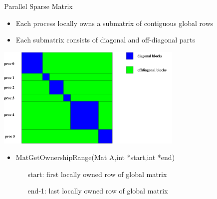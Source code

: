 
\begin{frame}{Parallel Sparse Matrix}
\begin{itemize}
  \item Each process locally owns a submatrix of contiguous global rows
  \item Each submatrix consists of diagonal and off-diagonal parts
\end{itemize}

\begin{center}
\includegraphics[width=3.5in]{figures/Mat/parallelSparseMatrix}
\end{center}

\begin{itemize}
  \item {\kb MatGetOwnershipRange(Mat A,int *start,int *end)}
  \begin{itemize}
    \item[{\kb start}:] first locally owned row of global matrix
    \item[{\kb end-1}:] last locally owned row of global matrix
  \end{itemize}
\end{itemize}
\end{frame}

